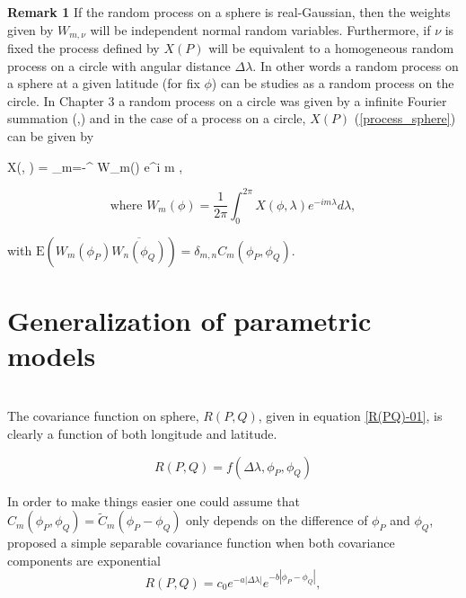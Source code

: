 	{\bf Remark 1} If the random process on a sphere is real-Gaussian, then the weights given by $W_{m,\nu}$ will be independent normal random variables. Furthermore, if $\nu$ is fixed the process defined by $X(P)$ will be equivalent to a homogeneous random process on a circle with angular distance $\Delta \lambda$. In other words a random process on a sphere at a given latitude (for fix $\phi$) can be studies as a random process on the circle. In Chapter 3 \label{process_circle} a random process on a circle was given by a infinite Fourier summation (\cite{Roy1972},\cite{DUFOUR1976107}) and in the case of a process on a circle, $X(P)$ (\ref{process_sphere}) can be given by   
		
	\beq \label{eq:sym_process} 
	X(\phi, \lambda) = \sum_{m=-\infty}^{\infty} W_m(\phi) e^{i m \lambda},
	\eeq
		
	\[
		\mbox{where } W_m(\phi) = \frac{1}{2\pi} \int_0^{2\pi} X(\phi, \lambda) e^{-i m \lambda} d \lambda,
	\]
		
	with $\mbox{E}(W_m(\phi_P) \overline{W_n(\phi_Q)}) = \delta_{m,n} C_m(\phi_P, \phi_Q)$. \\
	
		
	\section{Generalization of parametric models}
		
	 \\
		
	The covariance function on sphere, $R(P,Q)$,  given in equation \ref{R(PQ)-01}, is clearly a function of both longitude and latitude. 
	
	\[
		R(P,Q) = f(\Delta\lambda, \phi_P,\phi_Q)
	\]
		
	In order to make things easier one could assume that $C_m(\phi_P, \phi_Q) = \tilde{C}_m(\phi_P - \phi_Q)$ only depends on the difference of $\phi_P$ and $\phi_Q$, \cite{HuangZhangRobeson2011} proposed a simple separable covariance function when both covariance components are exponential
	\[
		R(P, Q) = c_0e^{-a|\Delta \lambda|}e^{-b|\phi_P - \phi_Q|},
	\]
		
